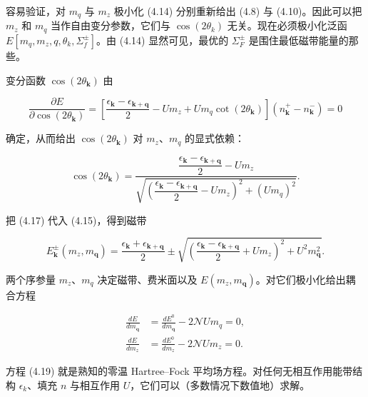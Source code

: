 容易验证，对 $m_{q}$ 与 $m_{z}$ 极小化 (4.14) 分别重新给出 (4.8) 与 (4.10)。因此可以把 $m_{z}$ 和 $m_{q}$ 当作自由变分参数，它们与 $\cos(2\theta_{k})$ 无关。现在必须极小化泛函 $E[m_{q}, m_{z}, q, \theta_{k}, \Sigma_{f}^{\pm}]$。由 (4.14) 显然可见，最优的 $\Sigma_{F}^{\pm}$ 是围住最低磁带能量的那些。

变分函数 $\cos(2\theta_{\mathbf{k}})$ 由

\begin{equation*}
\frac {\partial E}{\partial \cos ( 2 \theta_ {\mathbf {k}} )} = \left[ \frac {\epsilon_ {\mathbf {k}} - \epsilon_ {\mathbf {k} + \mathbf {q}}}{2} - U m _ {z} + U m _ {q} \cot ( 2 \theta_ {\mathbf {k}} ) \right] \left( n _ {\mathbf {k}} ^ {+} - n _ {\mathbf {k}} ^ {-} \right) = 0
\tag{4.16}
\end{equation*}

确定，从而给出 $\cos(2\theta_{\mathbf{k}})$ 对 $m_{z}$、$m_{q}$ 的显式依赖：

\begin{equation*}
\cos ( 2 \theta_ {\mathbf {k}} ) = \frac { \dfrac {\epsilon_ {\mathbf {k}} - \epsilon_ {\mathbf {k} + \mathbf {q}}}{2} - U m _ {z} }{ \sqrt { \left( \dfrac {\epsilon_ {\mathbf {k}} - \epsilon_ {\mathbf {k} + \mathbf {q}}}{2} - U m _ {z} \right) ^ {2} + ( U m _ {q} ) ^ {2} } }.
\tag{4.17}
\end{equation*}

把 (4.17) 代入 (4.15)，得到磁带

\begin{equation*}
E _ {\mathbf {k}} ^ {\pm} \left( m _ {z}, m _ {\mathbf {q}} \right) = \frac {\epsilon_ {\mathbf {k}} + \epsilon_ {\mathbf {k} + \mathbf {q}}}{2} \pm \sqrt { \left( \frac {\epsilon_ {\mathbf {k}} - \epsilon_ {\mathbf {k} + \mathbf {q}}}{2} + U m _ {z} \right) ^ {2} + U ^ {2} m _ {\mathbf {q}} ^ {2} }.
\tag{4.18}
\end{equation*}

两个序参量 $m_{z}$、$m_{q}$ 决定磁带、费米面以及 $E(m_{z}, m_{\mathbf{q}})$。对它们极小化给出耦合方程

\begin{align*}
\frac {d E}{d m _ {\mathbf {q}}} & = \frac {d E ^ {0}}{d m _ {\mathbf {q}}} - 2 \mathcal {N} U m _ {q} = 0,\\
\frac {d E}{d m _ {z}} & = \frac {d E ^ {0}}{d m _ {z}} - 2 \mathcal {N} U m _ {z} = 0.
\tag{4.19}
\end{align*}

方程 (4.19) 就是熟知的零温 Hartree--Fock 平均场方程。对任何无相互作用能带结构 $\epsilon_{k}$、填充 $n$ 与相互作用 $U$，它们可以（多数情况下数值地）求解。

